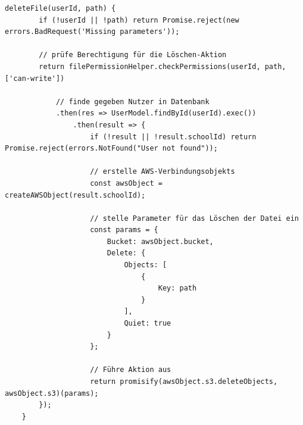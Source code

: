 \begin{lstlisting}[caption=deleteFile() Funktion der AWS S3-Strategy, label=code:awsS3deletefile]
	deleteFile(userId, path) {
		if (!userId || !path) return Promise.reject(new errors.BadRequest('Missing parameters'));
	
		// prüfe Berechtigung für die Löschen-Aktion
		return filePermissionHelper.checkPermissions(userId, path, ['can-write'])
	
			// finde gegeben Nutzer in Datenbank
			.then(res => UserModel.findById(userId).exec())
				.then(result => {
					if (!result || !result.schoolId) return Promise.reject(errors.NotFound("User not found"));
		
					// erstelle AWS-Verbindungsobjekts
					const awsObject = createAWSObject(result.schoolId);
		
					// stelle Parameter für das Löschen der Datei ein
					const params = {
						Bucket: awsObject.bucket,
						Delete: {
							Objects: [
								{
									Key: path
								}
							],
							Quiet: true
						}
					};
		
					// Führe Aktion aus
					return promisify(awsObject.s3.deleteObjects, awsObject.s3)(params);
		});
	}
\end{lstlisting}

